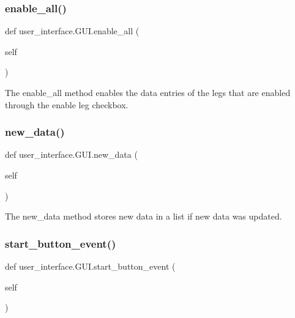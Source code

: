 \subsubsection{\texorpdfstring{enable\+\_\+all()}{enable\_all()}}
{\footnotesize\ttfamily def user\+\_\+interface.\+G\+U\+I.\+enable\+\_\+all (\begin{DoxyParamCaption}\item[{}]{self }\end{DoxyParamCaption})}



The enable\+\_\+all method enables the data entries of the legs that are enabled through the enable leg checkbox. 

\mbox{\label{classuser__interface_1_1GUI_a974d67b11bf11a3c6d30ca8ca3e86910}} 
\subsubsection{\texorpdfstring{new\+\_\+data()}{new\_data()}}
{\footnotesize\ttfamily def user\+\_\+interface.\+G\+U\+I.\+new\+\_\+data (\begin{DoxyParamCaption}\item[{}]{self }\end{DoxyParamCaption})}



The new\+\_\+data method stores new data in a list if new data was updated. 

\mbox{\label{classuser__interface_1_1GUI_a6c36b846f6241589929517ea0d7f0ecf}} 
\subsubsection{\texorpdfstring{start\+\_\+button\+\_\+event()}{start\_button\_event()}}
{\footnotesize\ttfamily def user\+\_\+interface.\+G\+U\+I.\+start\+\_\+button\+\_\+event (\begin{DoxyParamCaption}\item[{}]{self }\end{DoxyParamCaption})}



